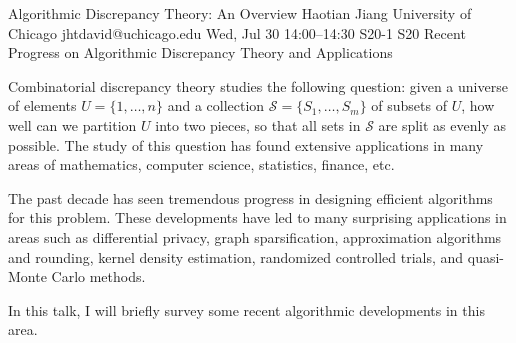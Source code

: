 \documentclass[12pt,lettersize,oneside]{book} %
\begin{document}
\begin{talk}
  {Algorithmic Discrepancy Theory: An Overview}%
  {Haotian Jiang}%
  {University of Chicago}%
  {jhtdavid@uchicago.edu}%
  {}%
  {}%
  {Wed, Jul 30 14:00--14:30}%
  {S20-1}%
  {S20}%
  {}
  {Recent Progress on Algorithmic Discrepancy Theory and Applications}
    
   
Combinatorial discrepancy theory studies the following question: given a universe of elements $U=\{1,\ldots, n\}$ and a collection $\mathcal{S} = \{S_1, \ldots, S_m\}$ of subsets of $U$, how well can we partition $U$ into two pieces, so that all sets in $\mathcal{S}$ are split as evenly as possible.
The study of this question has found extensive applications in many areas of mathematics, computer science, statistics, finance, etc. 

The past decade has seen tremendous progress in designing efficient algorithms for this problem. These developments have led to many surprising applications in areas such as differential privacy, graph sparsification, approximation algorithms and rounding, kernel density estimation, randomized controlled trials, and quasi-Monte Carlo methods.

In this talk, I will briefly survey some recent algorithmic developments in this area. 



\end{talk}
\end{document}
